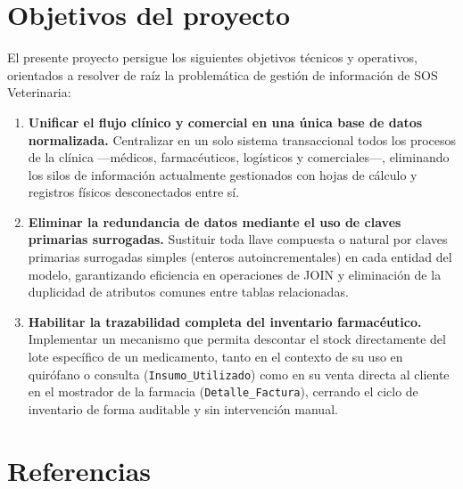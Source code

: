 \section{Objetivos del proyecto}

El presente proyecto persigue los siguientes objetivos técnicos y operativos, orientados a resolver de raíz la problemática de gestión de información de SOS Veterinaria:

\begin{enumerate}
	\item \textbf{Unificar el flujo clínico y comercial en una única base de datos normalizada.} Centralizar en un solo sistema transaccional todos los procesos de la clínica —médicos, farmacéuticos, logísticos y comerciales—, eliminando los silos de información actualmente gestionados con hojas de cálculo y registros físicos desconectados entre sí.
	\item \textbf{Eliminar la redundancia de datos mediante el uso de claves primarias surrogadas.} Sustituir toda llave compuesta o natural por claves primarias surrogadas simples (enteros autoincrementales) en cada entidad del modelo, garantizando eficiencia en operaciones de JOIN y eliminación de la duplicidad de atributos comunes entre tablas relacionadas.
	\item \textbf{Habilitar la trazabilidad completa del inventario farmacéutico.} Implementar un mecanismo que permita descontar el stock directamente del lote específico de un medicamento, tanto en el contexto de su uso en quirófano o consulta (\texttt{Insumo\_Utilizado}) como en su venta directa al cliente en el mostrador de la farmacia (\texttt{Detalle\_Factura}), cerrando el ciclo de inventario de forma auditable y sin intervención manual.
\end{enumerate}

\section{Referencias}

